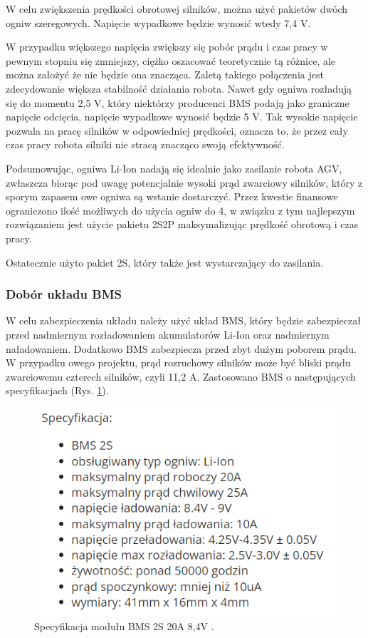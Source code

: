 \documentclass{report}
\begin{document}
\begin{enumerate}[label=(\Alph*)]
    W celu zwiększenia prędkości obrotowej silników, można użyć pakietów dwóch ogniw szeregowych. Napięcie wypadkowe będzie wynosić wtedy 7,4 V.
    
    W przypadku większego napięcia zwiększy się pobór prądu i czas pracy w pewnym stopniu się zmniejszy, ciężko oszacować teoretycznie tą różnice, ale można założyć że nie będzie ona znacząca. Zaletą takiego połączenia jest zdecydowanie większa stabilność działania robota. Nawet gdy ogniwa rozładują się do momentu 2,5 V, który niektórzy producenci BMS podają jako graniczne napięcie odcięcia, napięcie wypadkowe wynosić będzie 5 V. Tak wysokie napięcie pozwala na pracę silników w odpowiedniej prędkości, oznacza to, że przez cały czas pracy robota silniki nie stracą znacząco swoją efektywność.
    
    Podsumowując, ogniwa Li-Ion nadają się idealnie jako zasilanie robota AGV, zwłaszcza biorąc pod uwagę potencjalnie wysoki prąd zwarciowy silników, który z sporym zapasem owe ogniwa są wstanie dostarczyć. Przez kwestie finansowe ograniczono ilość możliwych do użycia ogniw do 4, w związku z tym najlepszym rozwiązaniem jest użycie pakietu 2S2P maksymalizując prędkość obrotową i czas pracy.

    Ostatecznie użyto pakiet 2S, który także jest wystarczający do zasilania.
    \end{enumerate}

\subsubsection{Dobór układu BMS}

W celu zabezpieczenia układu należy użyć układ BMS, który będzie zabezpieczał przed nadmiernym rozładowaniem akumulatorów Li-Ion oraz nadmiernym naładowaniem. Dodatkowo BMS zabezpiecza przed zbyt dużym poborem prądu. W przypadku owego projektu, prąd rozruchowy silników może być bliski prądu zwarciowemu czterech silników, czyli 11,2 A. Zastosowano BMS o następujących specyfikacjach (Rys. \ref{fig:spec-BMS}).

\begin{figure}[H]
    \centering
    \includegraphics{src/tech_specifications/BMS 2S 20A 8.4V.png}
    \caption{Specyfikacja modułu BMS 2S 20A 8,4V \cite{BMSSpec}.}
    \label{fig:spec-BMS}
\end{figure}
\end{document}
